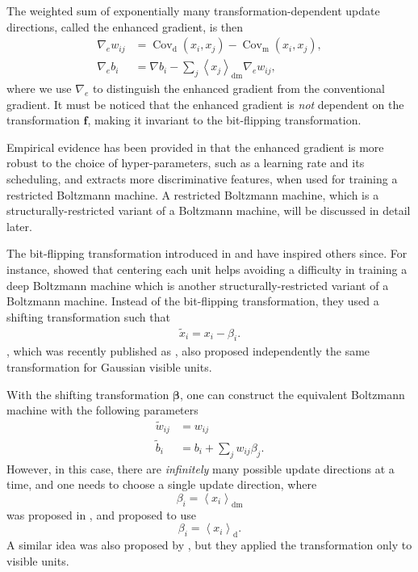 \documentclass[dissertation,nocontribution,draft*]{aaltoseries}
\newcommand{\vect}[1]{\mathbf{#1}}
\newcommand{\vects}[1]{\boldsymbol{#1}}
\newcommand{\cov}[0]{\operatorname{Cov}}
\newcommand{\vf}[0]{\vect{f}}
\newcommand{\td}[0]{\text{d}}
\newcommand{\vbeta}[0]{\vects{\beta}}
\newcommand{\tf}[0]{\text{m}}
\newcommand{\tdf}[0]{\text{dm}}
\begin{document}
The weighted sum of exponentially many
transformation-dependent update directions, called the
enhanced gradient, is then
\begin{align}
    \label{eq:enh_w}
  \nabla_e w_{ij} &=  \cov_\td(x_i,x_j)-\cov_\tf(x_i,x_j),
  \\
    \label{eq:enh_b}
  \nabla_e b_i &= \nabla b_i - \sum_j
  \left<x_j\right>_\tdf\nabla_e w_{ij},
\end{align}
where we use $\nabla_e$ to distinguish the enhanced gradient
from the conventional gradient. It must be noticed that the
enhanced gradient is \textit{not} dependent on the
transformation $\vf$, making it invariant to the
bit-flipping transformation.

Empirical evidence has been provided in 
that the enhanced gradient is more robust to the choice of
hyper-parameters, such as a learning rate and its
scheduling, and extracts more discriminative features, when
used for training a restricted Boltzmann machine. A
restricted Boltzmann machine, which is a
structurally-restricted variant of a Boltzmann machine, will
be discussed in detail later.

The bit-flipping transformation introduced in
 and  have inspired
others since.  For instance, \citet{Montavon2012} showed
that centering each unit helps avoiding a difficulty in
training a deep Boltzmann machine which is another
structurally-restricted variant of a Boltzmann machine.
Instead of the bit-flipping transformation, they used a
shifting transformation such that
\begin{align*}
    \tilde{x}_i  = x_i - \beta_i.
\end{align*}
\citet{Cho2011dlufl}, which was recently published as
, also proposed independently the same
transformation for Gaussian visible units.

With the shifting transformation $\vbeta$, one can construct
the equivalent Boltzmann machine with the following
parameters
\begin{align*}
    \tilde{w}_{ij} &= w_{ij} \\
    \tilde{b}_i &= b_i + \sum_{j} w_{ij} \beta_j.
\end{align*}
However, in this case, there are \textit{infinitely} many
possible update directions at a time, and one needs to
choose a single update direction, where 
\[
\beta_i = \left< x_i \right>_\tdf
\]
was proposed in , and 
\citet{Montavon2012}
proposed to use 
\[
\beta_i = \left< x_i \right>_\td.
\]
A similar idea was also proposed by \citet{Tang2011}, but
they applied the transformation only to visible units.
\end{document}
